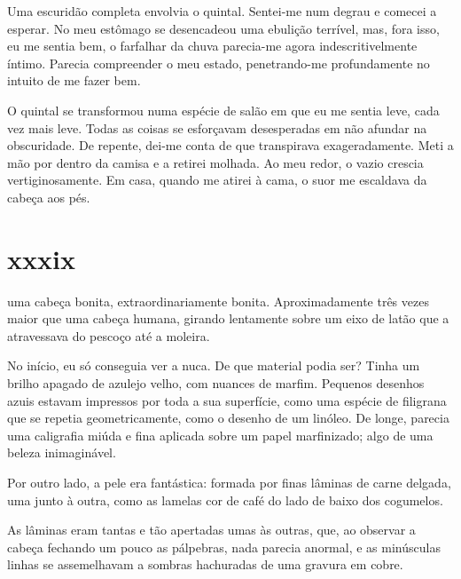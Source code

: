 Uma escuridão completa envolvia o quintal. Sentei-me num degrau e comecei a
esperar. No meu estômago se desencadeou uma ebulição terrível, mas, fora
isso, eu me sentia bem, o farfalhar da chuva parecia-me agora
indescritivelmente íntimo. Parecia compreender o meu estado, penetrando-me
profundamente no intuito de me fazer bem.

O quintal se transformou numa espécie de salão em que eu me sentia leve, cada
vez mais leve. Todas as coisas se esforçavam desesperadas em não afundar na
obscuridade. De repente, dei-me conta de que transpirava exageradamente. Meti
a mão por dentro da camisa e a retirei molhada. Ao meu redor, o vazio crescia
vertiginosamente. Em casa, quando me atirei à cama, o suor me escaldava da
cabeça aos pés.


\section{xxxix} 

 uma cabeça bonita, extraordinariamente bonita. Aproximadamente três vezes maior que uma cabeça humana, girando lentamente sobre um eixo de latão que a atravessava do pescoço até a moleira. 

No início, eu só conseguia ver a nuca. De que material podia ser? Tinha um
brilho apagado de azulejo velho, com nuances de marfim. Pequenos desenhos
azuis estavam impressos por toda a sua superfície, como uma espécie de
filigrana que se repetia geometricamente, como o desenho de um linóleo. De
longe, parecia uma caligrafia miúda e fina aplicada sobre um papel
marfinizado; algo de uma beleza inimaginável.



Por outro lado, a pele era fantástica: formada por finas lâminas de carne
delgada, uma junto à outra, como as lamelas cor de café do lado de baixo dos
cogumelos.

As lâminas eram tantas e tão apertadas umas às outras, que, ao observar a
cabeça fechando um pouco as pálpebras, nada parecia anormal, e as minúsculas
linhas se assemelhavam a sombras hachuradas de uma gravura em cobre.

